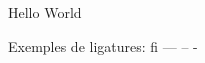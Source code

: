 \documentclass[11pt,twoside,openright]{report}
\begin{document}
  \begin{abstract}
    \blindtext
  \end{abstract}

  Hello World

  Exemples de ligatures: fi --- -- -

  \blinddocument
\end{document}
